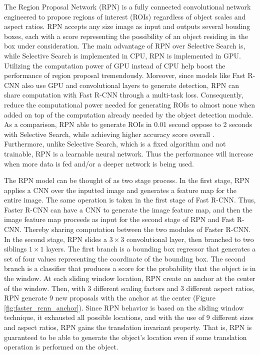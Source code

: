 The Region Proposal Network (RPN) is a fully connected convolutional network engineered to propose regions of interest (ROIs) regardless of object scales and aspect ratios. RPN accepts any size image as input and outputs several bouding boxes, each with a score representing the possibility of an object residing in the box under consideration. The main advantage of RPN over Selective Search is, while Selective Search is implemented in CPU, RPN is implemented in GPU. Utilizing the computation power of GPU instead of CPU help boost the performance of region proposal tremendously. Moreover, since models like Fast R-CNN also use GPU and convolutional layers to generate detection, RPN can share computation with Fast R-CNN through a multi-task loss. Consequently, reduce the computational power needed for generating ROIs to almost none when added on top of the computation already needed by the object detection module. As a comparison, RPN able to generate ROIs in 0.01 second oppose to 2 seconds with Selective Search, while achieving higher accuracy score overall \cite{faster_rcnn_2015}. Furthermore, unlike Selective Search, which is a fixed algorithm and not trainable, RPN is a learnable neural network. Thus the performance will increase when more data is fed and/or a deeper network is being used. 

The RPN model can be thought of as two stage process. In the first stage, RPN applies a CNN over the inputted image and generates a feature map for the entire image. The same operation is taken in the first stage of Fast R-CNN. Thus, Faster R-CNN can have a CNN to generate the image feature map, and then the image feature map proceeds as input for the second stage of RPN and Fast R-CNN. Thereby sharing computation between the two modules of Faster R-CNN. In the second stage, RPN slides a $3 \times 3$ convolutional layer, then branched to two siblings $1 \times 1$ layers. The first branch is a bounding box regressor that generates a set of four values representing the coordinate of the bounding box. The second branch is a classifier that produces a score for the probability that the object is in the window. At each sliding window location, RPN create an anchor at the center of the window. Then, with 3 different scaling factors and 3 different aspect ratios, RPN generate 9 new proposals with the anchor at the center (Figure \ref{fig:faster_rcnn_anchor}). Since RPN behavior is based on the sliding window technique, it exhausted all possible locations, and with the use of 9 different sizes and aspect ratios, RPN gains the translation invariant property. That is, RPN is guaranteed to be able to generate the object's location even if some translation operation is performed on the object.

